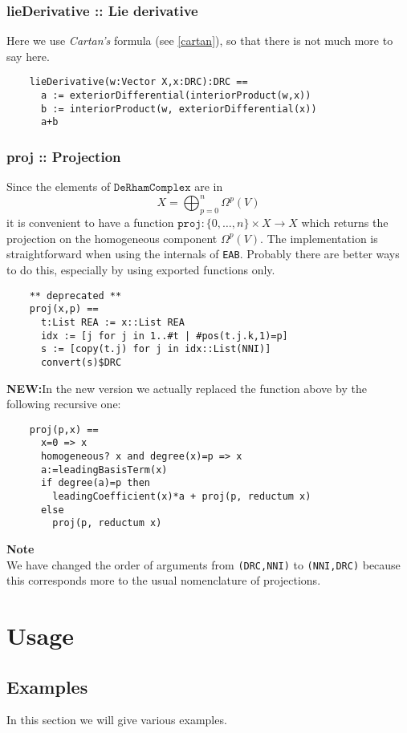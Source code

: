 \documentclass[12pt,a4paper]{article}
\begin{document}
\subsubsection{lieDerivative :: Lie derivative}
Here we use {\it Cartan's} formula (see \ref{cartan}), so that there is 
not much more to say here.
\begin{lstlisting}
    lieDerivative(w:Vector X,x:DRC):DRC ==
      a := exteriorDifferential(interiorProduct(w,x))
      b := interiorProduct(w, exteriorDifferential(x))
      a+b
\end{lstlisting}
%
\subsubsection{proj :: Projection}
Since the elements of $\mathtt{DeRhamComplex}$ are in
\begin{displaymath}
  X = \bigoplus_{p = 0}^n \Omega^p (V) 
\end{displaymath}
it is convenient to have a function 
$\mathtt{proj}:\{ 0, \ldots,n \}\times X \rightarrow X$ which 
returns the projection on the homogeneous component
$\Omega^p (V)$. The implementation is straightforward when using the
internals of {\tt EAB}. Probably there are better ways to do this,
especially by using exported functions only.
\begin{lstlisting}
    ** deprecated **
    proj(x,p) ==
      t:List REA := x::List REA
      idx := [j for j in 1..#t | #pos(t.j.k,1)=p]
      s := [copy(t.j) for j in idx::List(NNI)]
      convert(s)$DRC
\end{lstlisting}
{\bf NEW:}In the new version we actually replaced the function above by 
the following recursive one:
\begin{lstlisting}
    proj(p,x) ==
      x=0 => x
      homogeneous? x and degree(x)=p => x
      a:=leadingBasisTerm(x)
      if degree(a)=p then
        leadingCoefficient(x)*a + proj(p, reductum x)
      else
        proj(p, reductum x)
\end{lstlisting}
{\bf Note} \\
We have changed the order of arguments from 
{\tt (DRC,NNI)} to {\tt (NNI,DRC)} because this corresponds more to the 
usual nomenclature of projections.
%
\section{Usage}
\subsection{Examples}
In this section we will give various examples.
\end{document}
